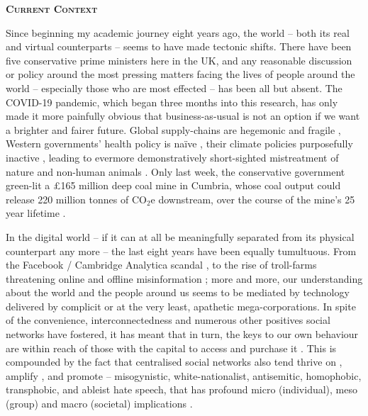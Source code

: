 \newpage
{}
{}
\begin{flushleft}
	\Huge \textsc{\textbf{Current Context}}
	
\end{flushleft}

\noindent Since beginning my academic journey eight years ago, the world -- both its real and virtual counterparts -- seems to have made tectonic shifts. There have been five conservative prime ministers here in the UK, and any reasonable discussion or policy around the most pressing matters facing the lives of people around the world -- especially those who are most effected -- has been all but absent. The COVID-19 pandemic, which began three months into this research, has only made it more painfully obvious that business-as-usual is not an option if we want a brighter and fairer future. Global supply-chains are hegemonic and fragile \citep{gomez2020}, Western governments' health policy is naïve \citep{navarro2021}, their climate policies purposefully inactive \citep{slawinski2017}, leading to evermore demonstratively short-sighted mistreatment of nature and non-human animals  \citep{monbiot2022}. Only last week, the conservative government green-lit a \pounds165 million deep coal mine in Cumbria, whose coal output could release 220 million tonnes of CO$_2$e downstream, over the course of the mine's 25 year lifetime \citep[Grubb and Barrett in][p. 252]{grubb2022}.

In the digital world -- if it can at all be meaningfully separated from its physical counterpart any more -- the last eight years have been equally tumultuous. From the Facebook / Cambridge Analytica scandal \citep{isaak2018}, to the rise of troll-farms threatening online and offline misinformation \citep{badawy2018}; more and more, our understanding about the world and the people around us seems to be mediated by technology delivered by complicit or at the very least, apathetic mega-corporations. In spite of the convenience, interconnectedness and numerous other positives social networks have fostered, it has meant that in turn, the keys to our own behaviour are within reach of those with the capital to access and purchase it \citep{zuboff2019}. This is compounded by the fact that centralised social networks also tend thrive on \citep{thorleifsson2022}, amplify \citep{mathew2019}, and promote \citep{ccdh2022,adl2022}  -- misogynistic, white-nationalist, antisemitic, homophobic, transphobic, and ableist hate speech, that has profound micro (individual), meso (group) and macro (societal) implications \citep{alkiviadou2019}. 

